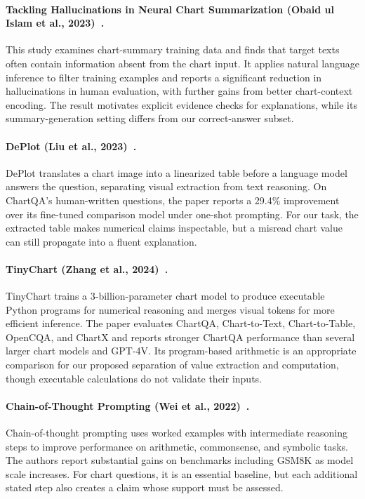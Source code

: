 \paragraph{Tackling Hallucinations in Neural Chart Summarization (Obaid ul Islam et al., 2023)~\cite{islam2023chart}.} This study examines chart-summary training data and finds that target texts often contain information absent from the chart input. It applies natural language inference to filter training examples and reports a significant reduction in hallucinations in human evaluation, with further gains from better chart-context encoding. The result motivates explicit evidence checks for explanations, while its summary-generation setting differs from our correct-answer subset.

\paragraph{DePlot (Liu et al., 2023)~\cite{liu2023deplot}.} DePlot translates a chart image into a linearized table before a language model answers the question, separating visual extraction from text reasoning. On ChartQA's human-written questions, the paper reports a 29.4\% improvement over its fine-tuned comparison model under one-shot prompting. For our task, the extracted table makes numerical claims inspectable, but a misread chart value can still propagate into a fluent explanation.

\paragraph{TinyChart (Zhang et al., 2024)~\cite{zhang2024tinychart}.} TinyChart trains a 3-billion-parameter chart model to produce executable Python programs for numerical reasoning and merges visual tokens for more efficient inference. The paper evaluates ChartQA, Chart-to-Text, Chart-to-Table, OpenCQA, and ChartX and reports stronger ChartQA performance than several larger chart models and GPT-4V. Its program-based arithmetic is an appropriate comparison for our proposed separation of value extraction and computation, though executable calculations do not validate their inputs.

\paragraph{Chain-of-Thought Prompting (Wei et al., 2022)~\cite{wei2022cot}.} Chain-of-thought prompting uses worked examples with intermediate reasoning steps to improve performance on arithmetic, commonsense, and symbolic tasks. The authors report substantial gains on benchmarks including GSM8K as model scale increases. For chart questions, it is an essential baseline, but each additional stated step also creates a claim whose support must be assessed.

